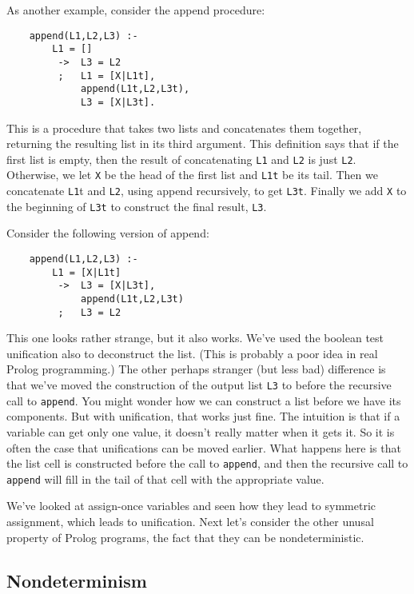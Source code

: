 As another example, consider the append procedure:
\begin{verbatim}
    append(L1,L2,L3) :-
        L1 = []
         ->  L3 = L2
         ;   L1 = [X|L1t],
             append(L1t,L2,L3t),
             L3 = [X|L3t].
\end{verbatim}
This is a procedure that takes two lists and concatenates them
together, returning the resulting list in its third argument.  This
definition says that if the first list is empty, then the result of
concatenating \verb|L1| and \verb|L2| is just \verb|L2|.  Otherwise,
we let \verb|X| be the head of the first list and \verb|L1t| be its
tail.  Then we concatenate \verb|L1|t and \verb|L2|, using append
recursively, to get \verb|L3t|.  Finally we add \verb|X| to the
beginning of \verb|L3t| to construct the final result, \verb|L3|.

Consider the following version of append:
\begin{verbatim}
    append(L1,L2,L3) :-
        L1 = [X|L1t]
         ->  L3 = [X|L3t],
             append(L1t,L2,L3t)
         ;   L3 = L2
\end{verbatim}
This one looks rather strange, but it also works.  We've used the
boolean test unification also to deconstruct the list.  (This is
probably a poor idea in real Prolog programming.)  The other perhaps
stranger (but less bad) difference is that we've moved the
construction of the output list \verb|L3| to before the recursive call
to \verb|append|.  You might wonder how we can construct a list before
we have its components.  But with unification, that works just fine.
The intuition is that if a variable can get only one value, it doesn't
really matter when it gets it.  So it is often the case that
unifications can be moved earlier.  What happens here is that the list
cell is constructed before the call to \verb|append|, and then the
recursive call to \verb|append| will fill in the tail of that cell
with the appropriate value.

We've looked at assign-once variables and seen how they lead to
symmetric assignment, which leads to unification.  Next let's consider
the other unusal property of Prolog programs, the fact that they can
be nondeterministic.

\subsection{Nondeterminism}

